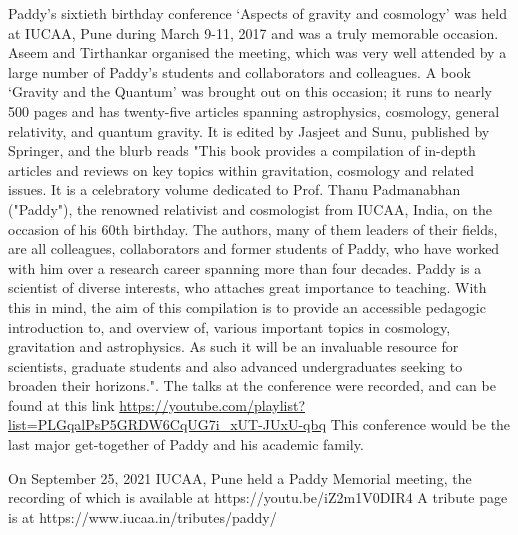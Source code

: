 \documentclass[prd, preprint, longbibliography, 12pt]{revtex4-2}
\begin{document}
Paddy's sixtieth birthday conference `Aspects of gravity and cosmology' was held at IUCAA, Pune during March 9-11, 2017 and was a truly memorable occasion. Aseem and Tirthankar organised the meeting, which was very well attended by a large number of Paddy's students and collaborators and colleagues. A book `Gravity and the Quantum' was brought out on this occasion; it runs to nearly 500 pages and has twenty-five articles spanning astrophysics, cosmology, general relativity, and quantum gravity. It is edited by Jasjeet and Sunu, published by Springer, and the blurb reads "This book provides a compilation of in-depth articles and reviews on key topics within gravitation, cosmology and related issues. It is a celebratory volume dedicated to Prof. Thanu Padmanabhan ("Paddy"), the renowned relativist and cosmologist from IUCAA, India, on the occasion of his 60th birthday. The authors, many of them leaders of their fields, are all colleagues, collaborators and former students of Paddy, who have worked with him over a research career spanning more than four decades. Paddy is a scientist of diverse interests, who attaches great importance to teaching. With this in mind, the aim of this compilation is to provide an accessible pedagogic introduction to, and overview of, various important topics in cosmology, gravitation and astrophysics. As such it will be an invaluable resource for scientists, graduate students and also advanced undergraduates seeking to broaden their horizons.". The talks at the conference were recorded, and can be found at this link \url {https://youtube.com/playlist?list=PLGqalPsP5GRDW6CqUG7i_xUT-JUxU-qbq} This conference would be the last major get-together of Paddy and his academic family.

On September 25, 2021 IUCAA, Pune held a Paddy Memorial meeting, the recording of which is available at https://youtu.be/iZ2m1V0DIR4 A tribute page is at https://www.iucaa.in/tributes/paddy/
\end{document}
